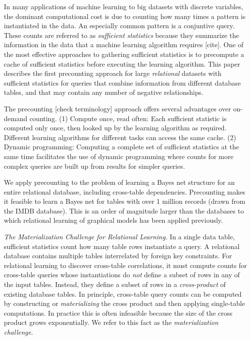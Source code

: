 \documentclass{vldb}
\begin{document}
In many applications of machine learning to big datasets with discrete variables, the dominant computational cost is due to counting how many times a pattern is instantiated in the data. An especially common pattern is a conjuntive query.
These counts are referred to as {\em sufficient statistics} because they summarize the information in the data that a machine learning algorithm requires [cite]. 
One of the most effective approaches to gathering sufficient statistics is to precompute a cache of sufficient statistics before executing the learning algorithm. This paper describes the first precounting approach for large {\em relational} datasets with sufficient statistics for queries that combine information from different database tables, and that may contain any number of negative relationships.

The precounting [check terminology] approach offers several advantages over on-demand counting. (1) Compute once, read often: Each sufficient statistic is computed only once, then looked up by the learning algorithm as required. Different learning algorithms for different tasks can access the same cache.
(2) Dynamic programming: Computing a complete set of sufficient statistics at the same time facilitates the use of dynamic programming where  counts for more complex queries are built up from results for simpler queries. 

We apply precounting to the problem of learning a Bayes net structure for an entire relational database, including cross-table dependencies. 
Precounting makes it feasible to learn a Bayes net for tables with over 1 million records (drawn from the IMDB database). This is an order of magnitude larger than the databases to which relational learning of graphical models  has been applied previously.

\emph{The Materialization Challenge for Relational Learning.}  
In a single data table, sufficient statistics count how many table rows instantiate a query. 
A relational database contains multiple tables interrelated by foreign key constraints. For relational learning to discover cross-table correlations, it must compute counts for cross-table queries whose instantiations do {\em not} 
 define a subset of rows in any of the input tables. 
Instead, they define a subset of rows in a {\em cross-product} of existing database tables. 
In principle, cross-table query counts can be computed by constructing or {\em materializing} the cross product and then applying single-table computations. 
In practice this is often infeasible because the size of the cross product grows exponentially. We refer to this fact as the {\em materialization challenge}. 
\end{document}
